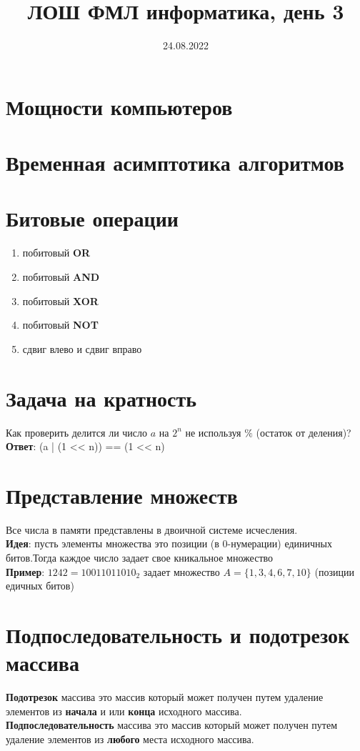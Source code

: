 \documentclass[12pt]{article}
\title{ЛОШ ФМЛ информатика, день 3}
\date{24.08.2022}
\begin{document}
    \maketitle
    \tableofcontents
    \section{Мощности компьютеров}
    \section{Временная асимптотика алгоритмов}
    
    \section{Битовые операции}
        \begin{enumerate} 
            \item побитовый \textbf{OR} 
            \item  побитовый \textbf{AND} 
            \item  побитовый \textbf{XOR}
            \item  побитовый \textbf{NOT}
            \item  сдвиг влево и сдвиг вправо
        \end{enumerate}
    \section{Задача на кратность}
    Как проверить делится ли число $a$ на $2^n$ не используя $\%$ (остаток от деления)?
    \\ 
    \textbf{Ответ}: (a | (1 << n)) == (1 << n)
    \section{Представление множеств}
    Все числа в памяти представлены в двоичной системе исчесления.
    \\
    \textbf{Идея}: пусть элементы множества это позиции (в 0-нумерации) единичных битов.Тогда каждое число задает свое кникальное множество
    \\
    \textbf{Пример}: $1242 = 10011011010_2$ задает множество $A = \{1 , 3 , 4 , 6 , 7 , 10\}$ (позиции едичных битов)
    \section{Подпоследовательность и подотрезок массива}
       \textbf{Подотрезок} массива это массив который может получен путем удаление элементов из \textbf{начала} и или \textbf{конца} исходного массива.
       \vspace{5mm}
       \\
    \textbf{Подпоследовательность} массива это массив который может получен путем удаление элементов из \textbf{любого} места исходного массива.
    
\end{document}
